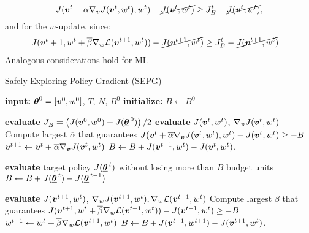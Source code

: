 \begin{equation*}
 J(\vv^{t} + \alpha \nabla_{\vv}J(\vv^t, w^t), w^t) - \cancel{J(\vv^t, w^t)} \geq \jbase[t] - \cancel{J(\vv^t, w^t)},
\end{equation*}
and for the $w$-update, since:
\begin{align*}
J(\vv^t+1, w^t + \overline{\beta} \gradDelta(\vv^{t+1}, w^t)) - \cancel{J(\vv^{t+1}, w^t)} &\geq \jbase[t] - \cancel{J(\vv^{t+1}, w^t)}
\end{align*}
Analogous considerations hold for MI.
\begin{algorithm}[t]
\caption{Safely-Exploring Policy Gradient (SEPG)}
    \label{alg:adaptive_exp}
    \begin{algorithmic}[1] 
	\State \textbf{input:} $\vtheta^0 = [\vv^0, w^0]$, $T$, $N$, $B^0$
        \State \textbf{initialize:} $B \gets B^0$
        
        \State \textbf{evaluate} $\jbase[] = \left(J(\vv^0, w^0) + J(\vtarget[0])\right) / 2$
            \State \textbf{evaluate} $J(\vv^t,w^t)$, $\nabla_{\vv}{J(\vv^t,w^t)}$ \label{alg:evaluate1}
			\State Compute largest $\overline{\alpha}$ that guarantees $J(\vv^t + \overline{\alpha} \nabla_{\vv}J(\vv^t, w^t), w^t) - J(\vv^t, w^t) \geq -B$ \label{alg:computealpha}
            \State $\vv^{t+1} \gets \vv^t + \overline{\alpha}\nabla_{\vv}{J(\vv^t, w^t)}$  
            \State $B \gets B + J(\vv^{t+1}, w^t) - J(\vv^t, w^t)$.


	            \State \textbf{evaluate} target policy $J(\vtarget)$ without losing more than $B$ budget units \label{alg:evaluatetarget}
    		        \State $B \gets B + J(\vtarget) - J(\vtarget[t-1])$
        		 \EndIf   
            
            \State \textbf{evaluate} $J(\vv^{t+1}, w^t)$, $\nabla_{w}{J(\vv^{t+1}, w^t)}, \gradDelta(\vv^{t+1},w^t)$ \label{alg:evaluate2}
            \State Compute largest $\overline{\beta}$ that guarantees $J(\vv^{t+1}, w^t + \overline{\beta} \gradDelta(\vv^{t+1}, w^t)) - J(\vv^{t+1}, w^t) \geq -B $ \label{alg:computebeta}
            \State $w^{t+1} \gets w^t + \overline{ \beta}\gradDelta(\vv^{t+1},w^t)$             
            \State $B \gets B + J(\vv^{t+1}, w^{t+1}) - J(\vv^{t+1}, w^t)$. 
        \EndFor
    \end{algorithmic}
\end{algorithm}


%
%
%
